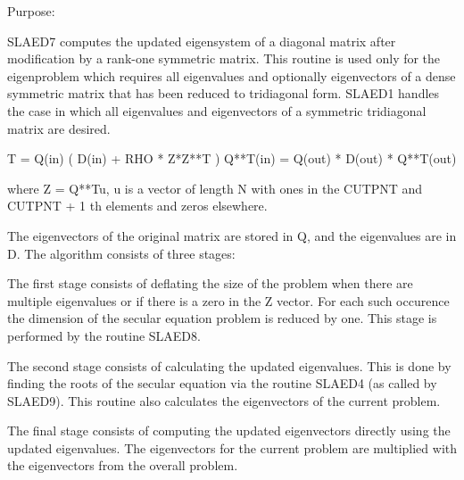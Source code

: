  \begin{DoxyParagraph}{Purpose\+: }
\begin{DoxyVerb} SLAED7 computes the updated eigensystem of a diagonal
 matrix after modification by a rank-one symmetric matrix. This
 routine is used only for the eigenproblem which requires all
 eigenvalues and optionally eigenvectors of a dense symmetric matrix
 that has been reduced to tridiagonal form.  SLAED1 handles
 the case in which all eigenvalues and eigenvectors of a symmetric
 tridiagonal matrix are desired.

   T = Q(in) ( D(in) + RHO * Z*Z**T ) Q**T(in) = Q(out) * D(out) * Q**T(out)

    where Z = Q**Tu, u is a vector of length N with ones in the
    CUTPNT and CUTPNT + 1 th elements and zeros elsewhere.

    The eigenvectors of the original matrix are stored in Q, and the
    eigenvalues are in D.  The algorithm consists of three stages:

       The first stage consists of deflating the size of the problem
       when there are multiple eigenvalues or if there is a zero in
       the Z vector.  For each such occurence the dimension of the
       secular equation problem is reduced by one.  This stage is
       performed by the routine SLAED8.

       The second stage consists of calculating the updated
       eigenvalues. This is done by finding the roots of the secular
       equation via the routine SLAED4 (as called by SLAED9).
       This routine also calculates the eigenvectors of the current
       problem.

       The final stage consists of computing the updated eigenvectors
       directly using the updated eigenvalues.  The eigenvectors for
       the current problem are multiplied with the eigenvectors from
       the overall problem.\end{DoxyVerb}
 
\end{DoxyParagraph}

